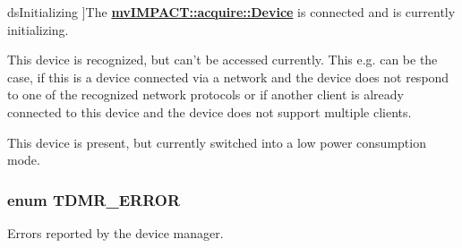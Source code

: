 \begin{Desc}
\begin{description}
{\hypertarget{group___common_interface_gga1207fea3233acb11831696cd74e142e8ac209e7998032d2474be5c69fae9472fc}{ds\+Initializing}\label{group___common_interface_gga1207fea3233acb11831696cd74e142e8ac209e7998032d2474be5c69fae9472fc}
}]The {\bfseries \hyperlink{classmv_i_m_p_a_c_t_1_1acquire_1_1_device}{mv\+I\+M\+P\+A\+C\+T\+::acquire\+::\+Device}} is connected and is currently initializing. \item[{\em 
\hypertarget{group___common_interface_gga1207fea3233acb11831696cd74e142e8acc0ce819ce175b0a9be645d5402bbc33}{ds\+Unreachable}\label{group___common_interface_gga1207fea3233acb11831696cd74e142e8acc0ce819ce175b0a9be645d5402bbc33}
}]This device is recognized, but can't be accessed currently. This e.\+g. can be the case, if this is a device connected via a network and the device does not respond to one of the recognized network protocols or if another client is already connected to this device and the device does not support multiple clients. \item[{\em 
\hypertarget{group___common_interface_gga1207fea3233acb11831696cd74e142e8abed97091db756a48b70cde7dd2bd5f54}{ds\+Power\+Down}\label{group___common_interface_gga1207fea3233acb11831696cd74e142e8abed97091db756a48b70cde7dd2bd5f54}
}]This device is present, but currently switched into a low power consumption mode. \end{description}
\end{Desc}
\hypertarget{group___common_interface_ga112225e5fbaaaef6445ff4ebf98f8e03}{
\subsubsection[{T\+D\+M\+R\+\_\+\+E\+R\+R\+O\+R}]{\setlength{\rightskip}{0pt plus 5cm}enum {\bf T\+D\+M\+R\+\_\+\+E\+R\+R\+O\+R}}}\label{group___common_interface_ga112225e5fbaaaef6445ff4ebf98f8e03}


Errors reported by the device manager. 

